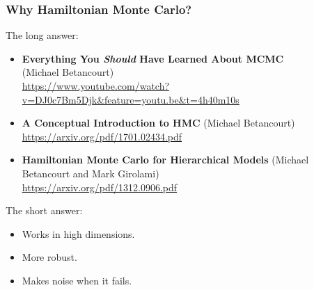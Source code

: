\documentclass[xcolor=dvipsnames]{beamer}
\begin{document}
\begin{frame}
\frametitle{Why Hamiltonian Monte Carlo?}

The long answer:
\begin{itemize}
\item \textbf{Everything You \emph{Should} Have Learned About MCMC} \\
(Michael Betancourt) \\
\url{https://www.youtube.com/watch?v=DJ0c7Bm5Djk&feature=youtu.be&t=4h40m10s}
\item \textbf{A Conceptual Introduction to HMC} (Michael Betancourt) \\
\url{https://arxiv.org/pdf/1701.02434.pdf}
\item \textbf{Hamiltonian Monte Carlo for Hierarchical Models}
(Michael Betancourt and Mark Girolami) \\
\url{https://arxiv.org/pdf/1312.0906.pdf}
\end{itemize}

\vspace{0.5cm}

The short answer:
\begin{itemize}
\item Works in high dimensions.
\item More robust.
\item Makes noise when it fails.
\end{itemize}

\end{frame}
\end{document}
